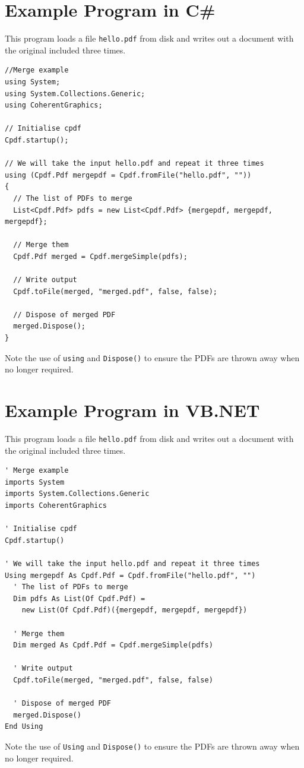 \documentclass{book}
\begin{document}
\begin{dotnetcpdflib}
\chapter*{Example Program in C\#}

This program loads a file \texttt{hello.pdf} from disk and writes out a
document with the original included three times.

\begin{small}
\begin{verbatim}
//Merge example
using System;
using System.Collections.Generic;
using CoherentGraphics;

// Initialise cpdf
Cpdf.startup();

// We will take the input hello.pdf and repeat it three times
using (Cpdf.Pdf mergepdf = Cpdf.fromFile("hello.pdf", ""))
{
  // The list of PDFs to merge
  List<Cpdf.Pdf> pdfs = new List<Cpdf.Pdf> {mergepdf, mergepdf, mergepdf};

  // Merge them
  Cpdf.Pdf merged = Cpdf.mergeSimple(pdfs);

  // Write output
  Cpdf.toFile(merged, "merged.pdf", false, false);
  
  // Dispose of merged PDF
  merged.Dispose();
}
\end{verbatim}
\end{small}

\noindent Note the use of \texttt{using} and \texttt{Dispose()} to ensure the PDFs are thrown away when no longer required.

\chapter*{Example Program in VB.NET}

This program loads a file \texttt{hello.pdf} from disk and writes out a
document with the original included three times.

\begin{small}
\begin{verbatim}
' Merge example
imports System
imports System.Collections.Generic
imports CoherentGraphics

' Initialise cpdf
Cpdf.startup()

' We will take the input hello.pdf and repeat it three times
Using mergepdf As Cpdf.Pdf = Cpdf.fromFile("hello.pdf", "")
  ' The list of PDFs to merge
  Dim pdfs As List(Of Cpdf.Pdf) =
    new List(Of Cpdf.Pdf)({mergepdf, mergepdf, mergepdf})

  ' Merge them
  Dim merged As Cpdf.Pdf = Cpdf.mergeSimple(pdfs)

  ' Write output
  Cpdf.toFile(merged, "merged.pdf", false, false)

  ' Dispose of merged PDF
  merged.Dispose()
End Using
\end{verbatim}
\end{small}

\noindent Note the use of \texttt{Using} and \texttt{Dispose()} to ensure the PDFs are thrown away when no longer required.

\end{dotnetcpdflib}
\end{document}
